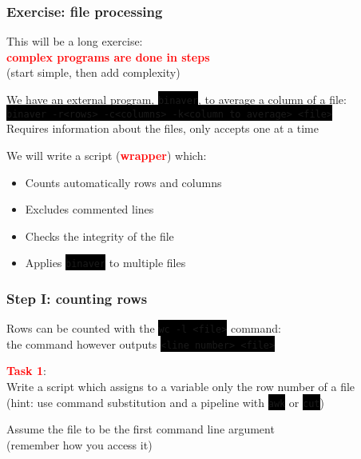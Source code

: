 \documentclass[unknownkeysallowed, 10pt, a4 paper, handout]{beamer}
\newcommand{\focus}[1]{\textbf{\textcolor{red}{#1}}}
\newcommand{\code}[1]{\colorbox{black}{\color{green}\texttt{#1}}}
\begin{document}
\begin{frame}
	\begin{center}
		\frametitle{Exercise: file processing}

		This will be a long exercise:\\
		\focus{complex programs are done in steps}\\
		(start simple, then add complexity)

		\vspace{3mm}
	
		We have an external program, \code{binaver}, to average a column of a file:\\
		\code{binaver -r<rows> -c<columns> -k<column to average> <file>}\\
		Requires information about the files, only accepts one at a time

		\vspace{3mm}

		We will write a script (\focus{wrapper}) which:

		\begin{itemize}
			\item Counts automatically rows and columns
			\item Excludes commented lines
			\item Checks the integrity of the file
			\item Applies \code{binaver} to multiple files
		\end{itemize}
	\end{center}
\end{frame}

\begin{frame}
	\begin{center}
		\frametitle{Step I: counting rows}

		Rows can be counted with the \code{wc -l <file>} command:\\
		the command however outputs \code{<line number> <file>}

		\vspace{8mm}

		\focus{Task 1}:\\
		Write a script which assigns to a variable only the row number of a file\\
		(hint: use command substitution and a pipeline with \code{awk} or \code{cut})

		Assume the file to be the first command line argument\\
		(remember how you access it)
	\end{center}
\end{frame}
\end{document}
